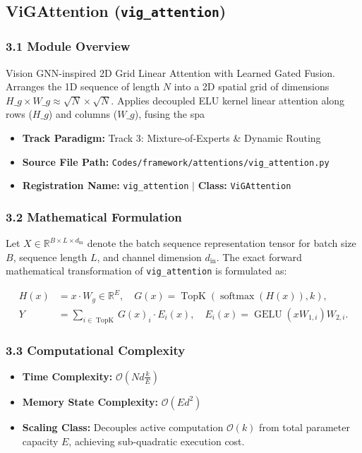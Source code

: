 \subsection{ViGAttention (\texttt{vig\_attention})}
\label{sec:app_module_vig\_attention}

\subsubsection*{3.1 Module Overview}
Vision GNN-inspired 2D Grid Linear Attention with Learned Gated Fusion.  Arranges the 1D sequence of length $N$ into a 2D spatial grid of dimensions $H\_g \times W\_g \approx \sqrt{N} \times \sqrt{N}$. Applies decoupled ELU kernel linear attention along rows ($H\_g$) and columns ($W\_g$), fusing the spa
\begin{itemize}
    \item \textbf{Track Paradigm:} Track 3: Mixture-of-Experts & Dynamic Routing
    \item \textbf{Source File Path:} \texttt{Codes/framework/attentions/vig\_attention.py}
    \item \textbf{Registration Name:} \texttt{vig\_attention} $\mid$ \textbf{Class:} \texttt{ViGAttention}
\end{itemize}

\subsubsection*{3.2 Mathematical Formulation}
Let $X \in \mathbb{R}^{B \times L \times d_{\text{in}}}$ denote the batch sequence representation tensor for batch size $B$, sequence length $L$, and channel dimension $d_{\text{in}}$. The exact forward mathematical transformation of \texttt{vig\_attention} is formulated as:

\begin{align}
H(x) &= x \cdot W_g \in \mathbb{R}^{E}, \quad G(x) = \operatorname{TopK}\left(\operatorname{softmax}(H(x)), k\right), \\
Y &= \sum_{i \in \operatorname{TopK}} G(x)_i \cdot E_i(x), \quad E_i(x) = \operatorname{GELU}(x W_{1, i}) W_{2, i}.
\end{align}


\subsubsection*{3.3 Computational Complexity}
\begin{itemize}
    \item \textbf{Time Complexity:} $\mathcal{O}(N d \frac{k}{E})$
    \item \textbf{Memory State Complexity:} $\mathcal{O}(E d^2)$
    \item \textbf{Scaling Class:} Decouples active computation $\mathcal{O}(k)$ from total parameter capacity $E$, achieving sub-quadratic execution cost.
\end{itemize}

